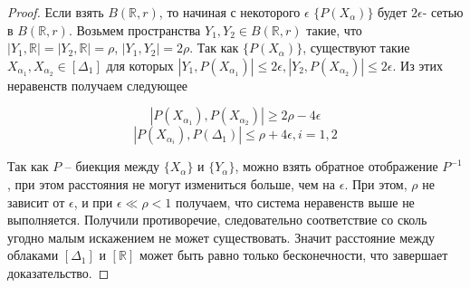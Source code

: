 \begin{proof}
	Если взять $B(\mathbb{R}, r)$, то начиная с некоторого $\epsilon$ $\{P(X_\alpha)\}$ будет $2\epsilon$- сетью в $B(\mathbb{R}, r)$. Возьмем пространства $Y_1, Y_2\in B(\mathbb{R}, r)$ такие, что $|Y_1,\mathbb{R}| = |Y_2,\mathbb{R}| = \rho$, $|Y_1,Y_2| = 2\rho$. Так как $\{P(X_\alpha)\}$, существуют такие $X_{\alpha_1}, X_{\alpha_2}\in [\Delta_1]$ для которых $|Y_1,P(X_{\alpha_1})| \le 2\epsilon, |Y_2,P(X_{\alpha_2})| \le 2\epsilon$. Из этих неравенств получаем следующее
	
	$$|P(X_{\alpha_1}), P(X_{\alpha_2})| \ge 2\rho - 4\epsilon$$
	$$|P(X_{\alpha_i}), P(\Delta_1)| \le \rho + 4\epsilon, i = 1, 2$$
	
	Так как $P$ -- биекция между $\{X_\alpha\}$ и $\{Y_\alpha\}$, можно взять обратное отображение $P^{-1}$, при этом расстояния не могут измениться больше, чем на $\epsilon$. При этом, $\rho$ не зависит от $\epsilon$, и при $\epsilon \ll \rho < 1$ получаем, что система неравенств выше не выполняется. Получили противоречие, следовательно соответствие со сколь угодно малым искажением не может существовать. Значит расстояние между облаками $[\Delta_1]$ и $[\mathbb{R}]$ может быть равно только бесконечности, что завершает доказательство.
\end{proof}
